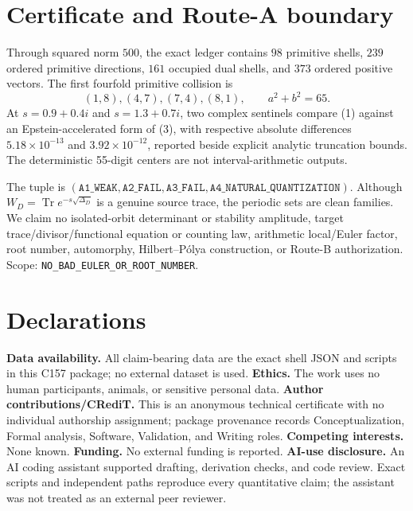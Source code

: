 \documentclass[10pt]{article}
\begin{document}
\section{Certificate and Route-A boundary}
Through squared norm $500$, the exact ledger contains $98$ primitive shells,
$239$ ordered primitive directions, $161$ occupied dual shells, and $373$
ordered positive vectors.  The first fourfold primitive collision is
\[(1,8),(4,7),(7,4),(8,1),\qquad a^2+b^2=65.\]
At $s=0.9+0.4i$ and $s=1.3+0.7i$, two complex sentinels compare (1)
against an Epstein-accelerated form of (3), with respective absolute
differences $5.18\times10^{-13}$ and $3.92\times10^{-12}$, reported beside
explicit analytic truncation bounds.  The deterministic 55-digit centers are
not interval-arithmetic outputs.

The tuple is $(\texttt{A1\_WEAK},\texttt{A2\_FAIL},
\texttt{A3\_FAIL},\texttt{A4\_NATURAL\_QUANTIZATION})$.
Although $W_D=\operatorname{Tr}e^{-s\sqrt{\Delta_D}}$ is a genuine source
trace, the periodic sets are clean families.  We claim no isolated-orbit
determinant or stability amplitude, target trace/divisor/functional equation
or counting law, arithmetic local/Euler factor, root number, automorphy,
Hilbert--P\'olya construction, or Route-B authorization.  Scope:
\texttt{NO\_BAD\_EULER\_OR\_ROOT\_NUMBER}.

\section*{Declarations}
\textbf{Data availability.}  All claim-bearing data are the exact shell JSON
and scripts in this C157 package; no external dataset is used.
\textbf{Ethics.}  The work uses no human participants, animals, or sensitive
personal data.  \textbf{Author contributions/CRediT.}  This is an anonymous
technical certificate with no individual authorship assignment; package
provenance records Conceptualization, Formal analysis, Software, Validation,
and Writing roles.  \textbf{Competing interests.}  None known.
\textbf{Funding.}  No external funding is reported.  \textbf{AI-use
disclosure.}  An AI coding assistant supported drafting, derivation checks,
and code review.  Exact scripts and independent paths reproduce every
quantitative claim; the assistant was not treated as an external peer reviewer.
\end{document}
